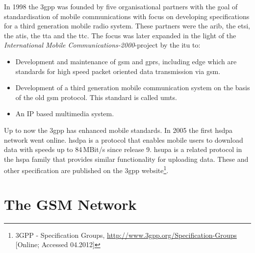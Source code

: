 In 1998 the \gls{3gpp} was founded by five organisational partners with the goal of standardisation of mobile communications with focus on developing specifications for a third generation mobile radio system.
These partners were the \gls{arib}, the \gls{etsi}, the \gls{atis}, the \gls{tta} and the \gls{ttc}.
The focus was later expanded in the light of the \emph{International Mobile Communications-2000}-project \cite{3gpp_Proposal2000} by the \gls{itu} to:
\begin{itemize}
	\item Development and maintenance of \gls{gsm} and \gls{gprs}, including \gls{edge} which are standards for high speed packet oriented data transmission via \gls{gsm}.
	\item Development of a third generation mobile communication system on the basis of the old \gls{gsm} protocol. This standard is called \gls{umts}.
	\item An IP based multimedia system.
\end{itemize}
Up to now the \gls{3gpp} has enhanced mobile standards.
In 2005 the first \gls{hsdpa} network went online.
\gls{hsdpa} \cite{hsdpa} is a protocol that enables mobile users to download data with speeds up to 84\,MBit/s since release 9.
\gls{hsupa} \cite{hsupa} is a related protocol in the \gls{hspa} family that provides similar functionality for uploading data.
These and other specification are published on the \gls{3gpp} website\footnote{3GPP - Specification Groups, \url{http://www.3gpp.org/Specification-Groups} [Online; Accessed 04.2012]}.

\section{The GSM Network}
\label{sec:network}


